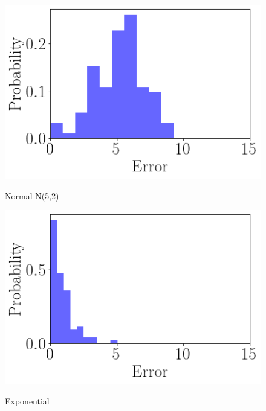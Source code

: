 \begin{figure}[ht]
  \begin{minipage}[b]{0.5\linewidth}
    \centering
    \includegraphics[width=\linewidth]{./img/distributions/normal_hist.png}
    \caption{Normal N(5,2)}
    \vspace{4ex}
  \end{minipage}%
  \begin{minipage}[b]{0.5\linewidth}
    \centering
    \includegraphics[width=\linewidth]{./img/distributions/exponential_hist.png}
    \caption{Exponential}
    \vspace{4ex}
    \label{exponential_hist}
  \end{minipage}
  \begin{minipage}[b]{0.5\linewidth}
    \centering

\end{minipage}
\end{figure}
